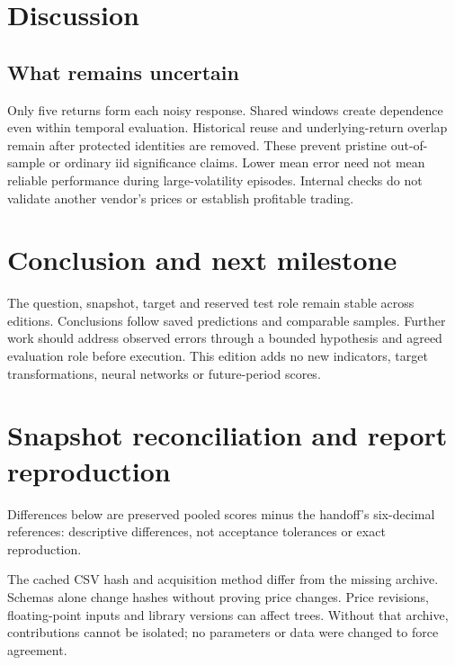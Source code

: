 \documentclass[10pt,letterpaper]{article}
\begin{document}
\section{Discussion}

\subsection{What remains uncertain}
Only five returns form each noisy response. Shared windows create dependence
even within temporal evaluation. Historical reuse and underlying-return overlap
remain after protected identities are removed. These prevent pristine
out-of-sample or ordinary iid significance claims. Lower mean error need not
mean reliable performance during large-volatility episodes. Internal checks do
not validate another vendor's prices or establish profitable trading.

\section{Conclusion and next milestone}

The question, snapshot, target and reserved test role remain stable across
editions. Conclusions follow saved predictions and comparable samples. Further
work should address observed errors through a bounded hypothesis and agreed
evaluation role before execution. This edition adds no new indicators, target
transformations, neural networks or future-period scores.

\clearpage\begingroup\small\endgroup
\clearpage\appendix
\renewcommand{\arraystretch}{0.95}\setlength{\parskip}{2pt}


\section{Snapshot reconciliation and report reproduction}
Differences below are preserved pooled scores minus the handoff's six-decimal
references: descriptive differences, not acceptance tolerances or exact reproduction.
\begin{center}\end{center}
The cached CSV hash and acquisition method differ from the missing archive.
Schemas alone change hashes without proving price changes. Price revisions,
floating-point inputs and library versions can affect trees. Without that archive,
contributions cannot be isolated; no parameters or data were changed to force agreement.
\end{document}
